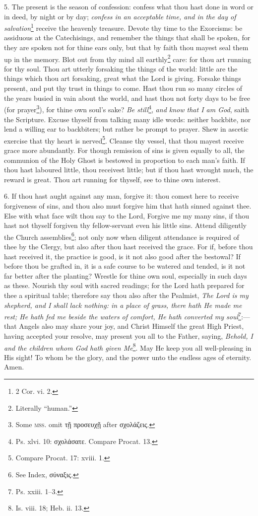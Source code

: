 5. The present is the season of confession: confess what thou hast done in word or in deed, by night or by day; \emph{confess in an acceptable time, and in the day of salvation}\footnote{2 Cor. vi. 2.} receive the heavenly treasure. Devote thy time to the Exorcisms: be assiduous at the Catechisings, and remember the things that shall be spoken, for they are spoken not for thine ears only, but that by faith thou mayest seal them up in the memory. Blot out from thy mind all earthly\footnote{Literally “human.”} care: for thou art running for thy soul. Thou art utterly forsaking the things of the world: little are the things which thou art forsaking, great what the Lord is giving. Forsake things present, and put thy trust in things to come. Hast thou run so many circles of the years busied in vain about the world, and hast thou not forty days to be free (for prayer\footnote{Some \textsc{mss.} omit \textgreek{τῇ προσευχῇ} after \textgreek{σχολάζεις}.}), for thine own soul’s sake? \emph{Be still}\footnote{Ps. xlvi. 10: \textgreek{σχολάσατε}. Compare Procat. 13.}, \emph{and know that I am God}, saith the Scripture. Excuse thyself from talking many idle words: neither backbite, nor lend a willing ear to backbiters; but rather be prompt to prayer. Shew in ascetic exercise that thy heart is nerved\footnote{Compare Procat. 17: xviii. 1.}. Cleanse thy vessel, that thou mayest receive grace more abundantly. For though remission of sins is given equally to all, the communion of the Holy Ghost is bestowed in proportion to each man’s faith. If thou hast laboured little, thou receivest little; but if thou hast wrought much, the reward is great. Thou art running for thyself, see to thine own interest.

6. If thou hast aught against any man, forgive it: thou comest here to receive forgiveness of sins, and thou also must forgive him that hath sinned against thee. Else with what face wilt thou say to the Lord, Forgive me my many sins, if thou hast not thyself forgiven thy fellow-servant even his little sins. Attend diligently the Church assemblies\footnote{See Index, \textgreek{σύναξις}.}; not only now when diligent attendance is required of thee by the Clergy, but also after thou hast received the grace. For if, before thou hast received it, the practice is good, is it not also good after the bestowal? If before thou be grafted in, it is a safe course to be watered and tended, is it not far better after the planting? Wrestle for thine own soul, especially in such days as these. Nourish thy soul with sacred readings; for the Lord hath prepared for thee a spiritual table; therefore say thou also after the Psalmist, \emph{The Lord is my shepherd, and I shall lack nothing: in a place of grass, there hath He made me rest; He hath fed me beside the waters of comfort, He hath converted my soul}\footnote{Ps. xxiii. 1–3.}:—that Angels also may share your joy, and Christ Himself the great High Priest, having accepted your resolve, may present you all to the Father, saying, \emph{Behold, I and the children whom God hath given Me}\footnote{Is. viii. 18; Heb. ii. 13.}. May He keep you all well-pleasing in His sight! To whom be the glory, and the power unto the endless ages of eternity. Amen.

